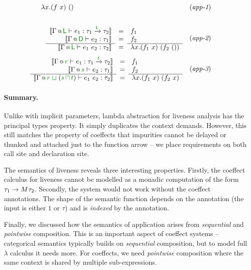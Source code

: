 \begin{figure}[t]
\begin{equation*}
\begin{array}{ll}
  {\lambda x . (f~x)~()}
& (\emph{app-1})
\\[2em]
\hspace{0.75em}\semdefff
  {\coctx{\Gamma}{\cclrd{\ident{L}}} \vdash e_1 : \tau_1 \xrightarrow{\cclrd{\ident{L}}} \tau_2}
  {\coctx{\Gamma}{\cclrd{\ident{D}}} \vdash e_2 : \tau_1}
  {\coctx{\Gamma}{\cclrd{\ident{L}}} \vdash e_1~e_2 : \tau_2}
  {f_1}
  {f_2}
  {\lambda x . (f_1~x)~(f_2~())}
& (\emph{app-2})
\\[2em]
\hspace{-1.6em}\semdefff
  {\coctx{\Gamma}{\cclrd{r}} \vdash e_1 : \tau_1 \xrightarrow{\cclrd{t}} \tau_2}
  {\coctx{\Gamma}{\cclrd{s}} \vdash e_2 : \tau_1}
  {\coctx{\Gamma}{\cclrd{r} \;\cclrd{\sqcup}\; (\cclrd{s} \,\cclrd{\sqcap}\, \cclrd{t})} \vdash e_1~e_2 : \tau_2}
  {f_1}
  {f_2}
  {\lambda x . (f_1~x)~(f_2~x)}
& (\emph{app-3})
\end{array}
\end{equation*}

\label{fig:applications-flat-livsem}
\vspace{0.5em}
\end{figure}


\paragraph{Summary.}
Unlike with implicit parameters, lambda abstraction for liveness analysis has the principal types
property. It simply duplicates the context demands. However, this still matches the
property of coeffects that impurities cannot be delayed or thunked and attached just to the
function arrow -- we place requirements on both call site and declaration site.

The semantics of liveness reveals three interesting properties. Firstly, the coeffect calculus for
liveness cannot be modelled as a monadic computation of the form $\tau_1 \rightarrow M^{}\tau_2$.
Secondly, the system would not work without the coeffect annotations.
The shape of the semantic function depends on the annotation (the input is either $1$ or $\tau$) and
is \emph{indexed} by the annotation.

Finally, we discussed how the semantics of application arises from \emph{sequential} and
\emph{pointwise} composition. This is an important aspect of coeffect systems -- categorical
semantics typically builds on \emph{sequential} composition, but to model full $\lambda$ calculus
it needs more. For coeffects, we need \emph{pointwise} composition where the same context
is shared by multiple sub-expressions.

